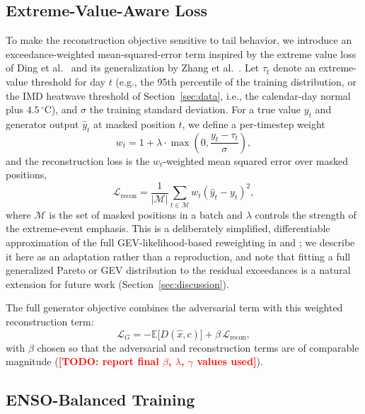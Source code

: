 \documentclass[conference]{IEEEtran}
\newcommand{\TODO}[1]{\textcolor{red}{\textbf{[TODO: #1]}}}
\begin{document}
\subsection{Extreme-Value-Aware Loss}

To make the reconstruction objective sensitive to tail behavior, we introduce an exceedance-weighted
mean-squared-error term inspired by the extreme value loss of Ding et al.~\cite{ding2019modeling} and
its generalization by Zhang et al.~\cite{zhang2021enhancing}. Let $\tau_t$ denote an extreme-value
threshold for day $t$ (e.g., the 95th percentile of the training distribution, or the IMD heatwave
threshold of Section~\ref{sec:data}, i.e., the calendar-day normal plus $4.5\,^{\circ}$C), and $\sigma$
the training standard deviation. For a true value $y_t$ and generator output $\hat y_t$ at masked
position $t$, we define a per-timestep weight
\begin{equation}
w_t = 1 + \lambda \cdot \max\!\left(0, \frac{y_t - \tau_t}{\sigma}\right),
\label{eq:weight}
\end{equation}
and the reconstruction loss is the $w_t$-weighted mean squared error over masked positions,
\begin{equation}
\mathcal{L}_{\text{recon}} = \frac{1}{|\mathcal{M}|}\sum_{t \in \mathcal{M}} w_t (\hat y_t - y_t)^2,
\label{eq:recon}
\end{equation}
where $\mathcal{M}$ is the set of masked positions in a batch and $\lambda$ controls the strength of the
extreme-event emphasis. This is a deliberately simplified, differentiable approximation of the full
GEV-likelihood-based reweighting in \cite{ding2019modeling} and \cite{zhang2021enhancing}; we describe
it here as an adaptation rather than a reproduction, and note that fitting a full generalized Pareto or
GEV distribution to the residual exceedances is a natural extension for future work
(Section~\ref{sec:discussion}).

The full generator objective combines the adversarial term with this weighted reconstruction term:
\begin{equation}
\mathcal{L}_G = -\mathbb{E}\big[D(\hat{x}, c)\big] + \beta \, \mathcal{L}_{\text{recon}},
\label{eq:gen}
\end{equation}
with $\beta$ chosen so that the adversarial and reconstruction terms are of comparable magnitude
(\TODO{report final $\beta$, $\lambda$, $\gamma$ values used}).

\subsection{ENSO-Balanced Training}
\end{document}
